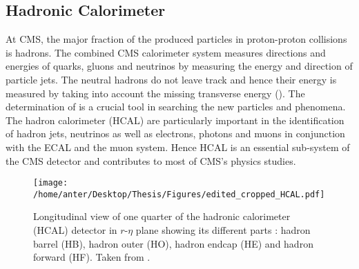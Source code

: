 \subsection{Hadronic Calorimeter}
At CMS, the major fraction of the produced particles in proton-proton collisions is hadrons. The combined CMS calorimeter system measures directions and energies of quarks, gluons and neutrinos by measuring the energy and direction of particle jets. The neutral hadrons do not leave track and hence their energy is measured by taking into account the missing transverse energy (\ETmiss). The determination of \ETmiss is a crucial tool in searching the new particles and phenomena. The hadron calorimeter (HCAL) are particularly important in the identification of hadron jets, neutrinos as well as electrons, photons and muons in conjunction with the ECAL and the muon system. Hence HCAL is an essential sub-system of the CMS detector and contributes to most of CMS's physics studies.
\begin{figure}[!h]
\begin{center}
\vspace*{3mm} 
\hspace*{-5mm}
\texttt{[image: /home/anter/Desktop/Thesis/Figures/edited\_cropped\_HCAL.pdf]}\\
\vspace*{4mm}
\caption{Longitudinal view of one quarter of the hadronic calorimeter (HCAL) detector in $r$-$\eta$ plane showing its different parts : hadron barrel (HB), hadron outer (HO), hadron endcap (HE) and hadron forward (HF). Taken from \cite{Chatrchyan:2008aa}.}
\label{fig:hcal}
\end{center}
\end{figure}

